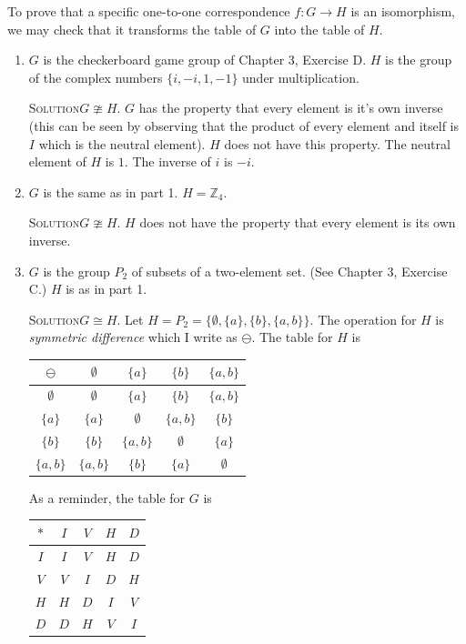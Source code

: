\documentclass[twoside]{amsart}
\newcommand{\solution}{\textsc{Solution}\xspace}
\newcommand{\iso}{\cong}
\newcommand{\niso}{\ncong}
\newcommand{\blank}{\vspace{5pt}}
\begin{document}
\begin{enumerate}[A.]
	To prove that a specific one-to-one correspondence $f:G \to H$ is an
	isomorphism, we may check that it transforms the table of $G$ into
	the table of $H$.

	\begin{enumerate}[1]
		\item $G$ is the checkerboard game group of Chapter 3, Exercise D.
		$H$ is the group of the complex numbers $\{i, -i, 1, -1\}$ under
		multiplication.

		\blank \noindent \solution $G \niso H$. $G$ has the property 
		that every element is it's own inverse (this can be seen by observing
		that the product of every element and itself is $I$ which is the
		neutral element). $H$ does not have this property.
		The neutral element of $H$ is $1$. The inverse of $i$ is $-i$.

		\blank
		\item $G$ is the same as in part 1. $H=\mathbb{Z}_4$.

		\blank \noindent \solution $G \niso H$. $H$ does not have
		the property that every element is its own inverse.

		\blank
		\item $G$ is the group $P_2$ of subsets of a two-element set. (See
		Chapter 3, Exercise C.) $H$ is as in part 1.

		\blank\noindent\solution $G \iso H$. Let $H = P_2 = \{\emptyset,
		\{a\}, \{b\}, \{a,b\}\}$. The operation for $H$ is 
		\emph{symmetric difference} which I write as $\ominus$.
		The table for $H$ is

		\blank
		\begin{center}
		\begin{tabular}{c|cccc}
		   $\ominus$   & $\emptyset$ & $\{a\}$ & $\{b\}$ & $\{a,b\}$ \\ \hline
			$\emptyset$ & $\emptyset$ & $\{a\}$ & $\{b\}$ & $\{a,b\}$ \\ 
			$\{a\}$     & $\{a\}$ & $\emptyset$ & $\{a,b\}$ & $\{b\}$ \\
			$\{b\}$     & $\{b\}$ & $\{a,b\}$ & $\emptyset$ & $\{a\}$ \\
			$\{a,b\}$   & $\{a,b\}$ & $\{b\}$ & $\{a\}$ & $\emptyset$
		\end{tabular}
		\end{center}
		\blank

		As a reminder, the table for $G$ is
		\blank
		\begin{center}
		\begin{tabular}{c|cccc}
		   $*$ & $I$ & $V$ & $H$ & $D$ \\ \hline
		   $I$ & $I$ & $V$ & $H$ & $D$ \\
		   $V$ & $V$ & $I$ & $D$ & $H$ \\
		   $H$ & $H$ & $D$ & $I$ & $V$ \\
		   $D$ & $D$ & $H$ & $V$ & $I$
		\end{tabular}
		\end{center}
		\blank


\end{enumerate}
\end{enumerate}
\end{document}
